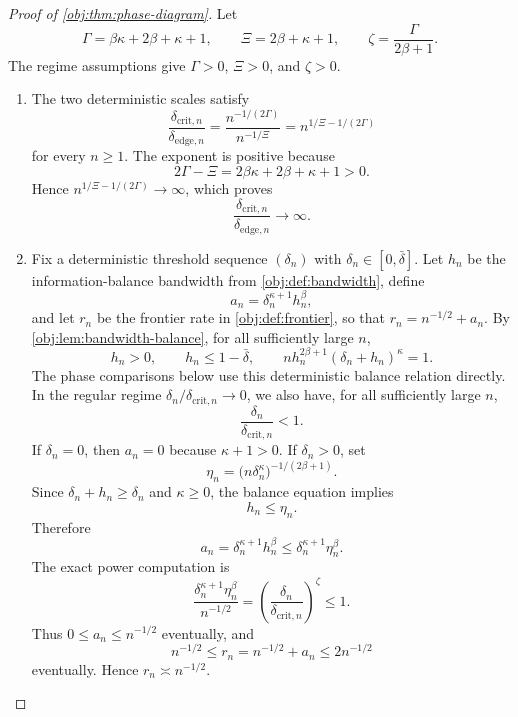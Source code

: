 \begin{proof}[Proof of \cref{obj:thm:phase-diagram}]
Let
\[
\Gamma=\beta\kappa+2\beta+\kappa+1,
\qquad
\Xi=2\beta+\kappa+1,
\qquad
\zeta=\frac{\Gamma}{2\beta+1}.
\]
The regime assumptions give \(\Gamma>0\), \(\Xi>0\), and \(\zeta>0\).

\begin{enumerate}
\item The two deterministic scales satisfy
\[
\frac{\delta_{\mathrm{crit},n}}{\delta_{\mathrm{edge},n}}
=
\frac{n^{-1/(2\Gamma)}}{n^{-1/\Xi}}
=
n^{1/\Xi-1/(2\Gamma)}
\]
for every \(n\ge1\).  The exponent is positive because
\[
2\Gamma-\Xi
=
2\beta\kappa+2\beta+\kappa+1>0.
\]
Hence \(n^{1/\Xi-1/(2\Gamma)}\to\infty\), which proves
\[
\frac{\delta_{\mathrm{crit},n}}{\delta_{\mathrm{edge},n}}\to\infty .
\]

\item Fix a deterministic threshold sequence \((\delta_n)\) with
\(\delta_n\in[0,\bar\delta]\).  Let \(h_n\) be the information-balance bandwidth
from \cref{obj:def:bandwidth}, define
\[
a_n=\delta_n^{\kappa+1}h_n^\beta,
\]
and let \(r_n\) be the frontier rate in \cref{obj:def:frontier}, so that
\(r_n=n^{-1/2}+a_n\).  By \cref{obj:lem:bandwidth-balance}, for all sufficiently
large \(n\),
\[
h_n>0,
\qquad
h_n\le 1-\bar\delta,
\qquad
n h_n^{2\beta+1}(\delta_n+h_n)^\kappa=1 .
\]
The phase comparisons below use this deterministic balance relation directly.
In the regular regime \(\delta_n/\delta_{\mathrm{crit},n}\to0\), we also have,
for all sufficiently large \(n\),
\[
\frac{\delta_n}{\delta_{\mathrm{crit},n}}<1 .
\]
If \(\delta_n=0\), then \(a_n=0\) because \(\kappa+1>0\).  If \(\delta_n>0\), set
\[
\eta_n=\bigl(n\delta_n^\kappa\bigr)^{-1/(2\beta+1)} .
\]
Since \(\delta_n+h_n\ge\delta_n\) and \(\kappa\ge0\), the balance equation implies
\[
h_n\le \eta_n .
\]
Therefore
\[
a_n
=
\delta_n^{\kappa+1}h_n^\beta
\le
\delta_n^{\kappa+1}\eta_n^\beta .
\]
The exact power computation is
\[
\frac{\delta_n^{\kappa+1}\eta_n^\beta}{n^{-1/2}}
=
\left(\frac{\delta_n}{\delta_{\mathrm{crit},n}}\right)^\zeta
\le 1 .
\]
Thus \(0\le a_n\le n^{-1/2}\) eventually, and
\[
n^{-1/2}\le r_n=n^{-1/2}+a_n\le 2n^{-1/2}
\]
eventually.  Hence \(r_n\asymp n^{-1/2}\).


\end{enumerate}
\end{proof}

